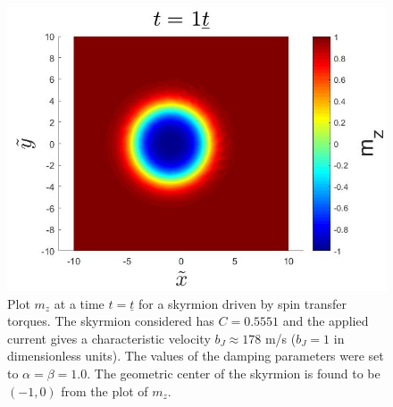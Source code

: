 \begin{figure}[h!]
\centering
  \centering
  \includegraphics[width=.6\linewidth]{Figures/SkyrmionMzSTTa1b1.jpg}
\caption{Plot $m_z$ at a time $t=\underline{t}$ for a skyrmion driven by spin transfer torques. The skyrmion considered has $C=0.5551$ and the applied current gives a characteristic velocity $b_J\approx 178$ m/s ($b_J=1$ in dimensionless units). The values of the damping parameters were set to $\alpha=\beta=1.0$. The geometric center of the skyrmion is found to be $\left(-1, 0\right)$ from the plot of $m_z$.}
\label{fig:SkyrmionMotionSTTa1b1}
\end{figure}

